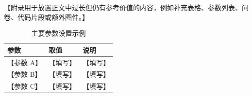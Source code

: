 【附录用于放置正文中过长但仍有参考价值的内容，例如补充表格、参数列表、问卷、代码片段或额外图件。】

\begin{table}[ht]
  \centering
  \caption{主要参数设置示例}
  \begin{tabular}{lll}
    \toprule
    参数 & 取值 & 说明 \\
    \midrule
    【参数 A】 & 【填写】 & 【填写】 \\
    【参数 B】 & 【填写】 & 【填写】 \\
    【参数 C】 & 【填写】 & 【填写】 \\
    \bottomrule
  \end{tabular}
\end{table}
